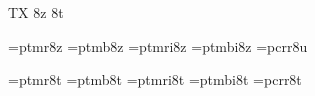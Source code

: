 
\ifx\ffdecl\undefined  \fi

\ffdecl [Times] {\rm \bf \it \bi} {\caps{\rm\bf}} {} {TX} {8z 8t}

\def\caps{\ffvars{r}{b}{!}{!}\ffsetV{caps}{c}\ffsetX} 
\def\nocaps{\ffsetX} 
\nocaps\relax %
\def\ffwarning#1{\ffmessage{FONT warning: Times - \string\caps#1 unavailable}}

\ismacro{}\ifttrue
   \font\tenrm=ptmr8z   \sizespec
   \font\tenbf=ptmb8z   \sizespec
   \font\tenit=ptmri8z  \sizespec
   \font\tenbi=ptmbi8z  \sizespec
   \font\tentt=pcrr8u   \sizespec
   \let\tensl=\tenit

   \def\ffnamegen{ptm\ffvarV\capsV 8z}

   
\fi

\ismacro{}\ifttrue
   \font\tenrm=ptmr8t   \sizespec
   \font\tenbf=ptmb8t   \sizespec
   \font\tenit=ptmri8t  \sizespec
   \font\tenbi=ptmbi8t  \sizespec
   \font\tentt=pcrr8t   \sizespec
   \let\tensl=\tenit

   \def\ffnamegen{ptm\ffvarV\capsV 8t}
\fi

\tenrm

\let\setsimplemath=\relax %

\def\tmTeX{T\kern-.1667em\lower.3333ex\hbox{E}\kern-.125emX}
\ifx\origTeX\undefined \let\origTeX=\TeX \fi
\let\TeX=\tmTeX

\ifx\loadmathfonts\relax \endinput \fi
\ifx\mathpreloaded X\else  \fi                     


